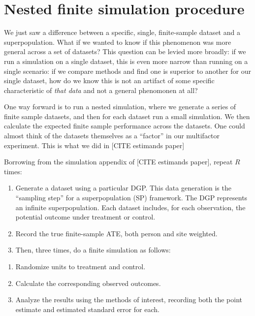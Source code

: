 \documentclass[
]{book}
\providecommand{\tightlist}{%
  \setlength{\itemsep}{0pt}\setlength{\parskip}{0pt}}
\begin{document}
\hypertarget{nested-finite-simulation-procedure}{%
\section{Nested finite simulation procedure}\label{nested-finite-simulation-procedure}}

We just saw a difference between a specific, single, finite-sample dataset and a superpopulation.
What if we wanted to know if this phenomenon was more general across a set of datasets?
This question can be levied more broadly: if we run a simulation on a single dataset, this is even more narrow than running on a single scenario: if we compare methods and find one is superior to another for our single dataset, how do we know this is not an artifact of some specific characteristic of \emph{that data} and not a general phenomonen at all?

One way forward is to run a nested simulation, where we generate a series of finite sample datasets, and then for each dataset run a small simulation.
We then calculate the expected finite sample performance across the datasets.
One could almost think of the datasets themselves as a ``factor'' in our multifactor experiment.
This is what we did in {[}CITE estimands paper{]}

Borrowing from the simulation appendix of {[}CITE estimands paper{]}, repeat \(R\) times:

\begin{enumerate}
\def\labelenumi{\arabic{enumi}.}
\item
  Generate a dataset using a particular DGP. This data generation is the ``sampling step'' for a superpopulation (SP) framework. The DGP represents an inﬁnite superpopulation. Each dataset includes, for each observation, the potential outcome under treatment or control.
\item
  Record the true finite-sample ATE, both person and site weighted.
\item
  Then, three times, do a finite simulation as follows:
\end{enumerate}

\begin{enumerate}
\def\labelenumi{\alph{enumi}.}
\tightlist
\item
  Randomize units to treatment and control.
\item
  Calculate the corresponding observed outcomes.
\item
  Analyze the results using the methods of interest, recording both the point estimate and estimated standard error for each.
\end{enumerate}
\end{document}
